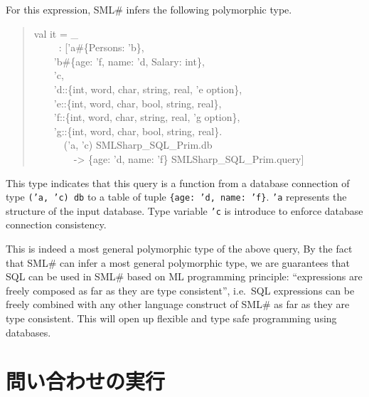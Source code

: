 \documentclass{jbook}
\newcommand{\txt}[2]{#1}
\newcommand{\smlsharp}{SML\#}
\newcommand{\myem}{\mbox{\ \ }}
\newenvironment{program}{\begin{quote}\begin{tt}}%
                        {\end{tt}\end{quote}}
\begin{document}
	For this expression, \smlsharp{} infers the following
polymorphic type.
\begin{program}
val it = \_
\\\myem\ \ \   : ['a\#\{Persons: 'b\},
\\\myem\myem     'b\#\{age: 'f, name: 'd, Salary: int\},
\\\myem\myem     'c,
\\\myem\myem     'd::\{int, word, char, string, real, 'e option\},
\\\myem\myem     'e::\{int, word, char, bool, string, real\},
\\\myem\myem     'f::\{int, word, char, string, real, 'g option\},
\\\myem\myem     'g::\{int, word, char, bool, string, real\}.
\\\myem\myem\myem       ('a, 'c) SMLSharp\_SQL\_Prim.db
\\\myem\myem\myem\myem  -> \{age: 'd, name: 'f\} SMLSharp\_SQL\_Prim.query]
\end{program}
	This type indicates that this query is a function from a database
connection of type {\tt  ('a, 'c) db} to a table of tuple {\tt \{age: 'd,
name: 'f\}}.
	{\tt 'a} represents the structure of the input database.
	Type variable {\tt 'c} is introduce to enforce database
connection consistency.
	
	This is indeed a most general polymorphic type of the above
query,
	By the fact that \smlsharp{} can infer a most general
polymorphic type, we are guarantees that SQL can be used in \smlsharp{}
based on ML programming principle: ``expressions are freely
composed as far as they are type consistent'', i.e.\ 
SQL expressions can be freely combined with any other language construct
of \smlsharp{} as far as they are type consistent.
	This will open up flexible and type safe programming using
databases.

\fi%

\section{\txt{問い合わせの実行}{Query execution}}
\label{sec:tutorialExecutingSQL}
\end{document}
